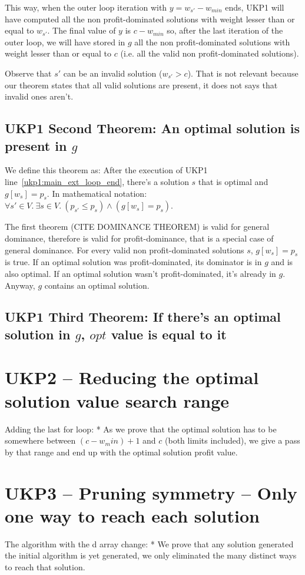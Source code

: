 \documentclass[12pt]{article}
\begin{document}
This way, when the outer loop iteration with \(y = w_{s'}-w_{min}\) ends, UKP1 will have computed all the non profit-dominated solutions with weight lesser than or equal to \(w_{s'}\). The final value of \(y\) is \(c-w_{min}\) so, after the last iteration of the outer loop, we will have stored in \(g\) all the non profit-dominated solutions with weight lesser than or equal to \(c\) (i.e. all the valid non profit-dominated solutions).

Observe that \(s'\) can be an invalid solution (\(w_{s'} > c\)). That is not relevant because our theorem states that all valid solutions are present, it does not says that invalid ones aren't.

\subsection{UKP1 Second Theorem: An optimal solution is present in \(g\)}

We define this theorem as: After the execution of UKP1 line~\ref{ukp1:main_ext_loop_end}, there's a solution \(s\) that is optimal and \(g[w_s] = p_s\). In mathematical notation: \(\forall s' \in V.~\exists s \in V.~(p_{s'} \leq p_s) \land (g[w_s] = p_s)\).

The first theorem (CITE DOMINANCE THEOREM) is valid for general dominance, therefore is valid for profit-dominance, that is a special case of general dominance. For every valid non profit-dominated solutions \(s\), \(g[w_s] = p_s\) is true. If an optimal solution was profit-dominated, its dominator is in \(g\) and is also optimal. If an optimal solution wasn't profit-dominated, it's already in \(g\). Anyway, \(g\) contains an optimal solution.

\subsection{UKP1 Third Theorem: If there's an optimal solution in \(g\), \(opt\) value is equal to it}

\section{UKP2 -- Reducing the optimal solution value search range}
Adding the last for loop:
	* As we prove that the optimal solution has to be somewhere between \((c-w_min)+1\) and \(c\) (both limits included), we give a pass by that range and end up with the optimal solution profit value.

\section{UKP3 -- Pruning symmetry -- Only one way to reach each solution}
The algorithm with the d array change:
	* We prove that any solution generated the initial algorithm is yet generated, we only eliminated the many distinct ways to reach that solution.
\end{document}
